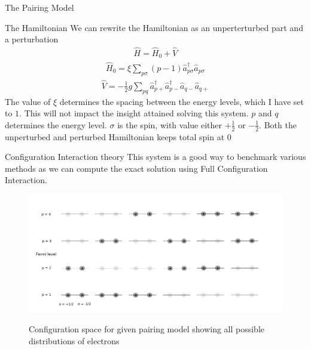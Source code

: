 \documentclass[twoside,english]{uiofysmaster}
\begin{document}
\begin{chapter}{The Pairing Model}
\begin{section}{The Hamiltonian}
		We can rewrite the Hamiltonian as an unperterturbed part and a perturbation
		\begin{align}
			\hat H = \hat H_0 + \hat V
		\end{align}
		\begin{align}
			\hat H_0 = \xi \sum_{p \sigma} (p-1) \hat a_{p \sigma}^{\dagger} \hat a_{p \sigma}
		\end{align}
		\begin{align}
			\hat V = - \frac{1}{2}g \sum_{pq} \hat a_{p +}^{\dagger} \hat a_{p-}^{\dagger} \hat a_{q-} \hat a_{q+}
		\end{align}
		The value of $\xi$ determines the spacing between the energy levels, which I have set to $1$. This will not impact the insight attained solving this system. $p$ and $q$ determines the energy level. $\sigma$ is the spin, with value either $+\frac{1}{2}$ or $-\frac{1}{2}$. Both the unperturbed and perturbed Hamiltonian keeps total spin at $0$
	\end{section}
	\begin{section}{Configuration Interaction theory}
		This system is a good way to benchmark various methods as we can compute the exact solution using Full Configuration Interaction. 
		\begin{figure}
			\includegraphics[width=1.1\linewidth]{Figures/Pairing_model2.pdf}
			\label{PairingModel_2}
			\caption{Configuration space for given pairing model showing all possible distributions of electrons}
		\end{figure}

		
	\end{section}

\end{chapter}
\end{document}
